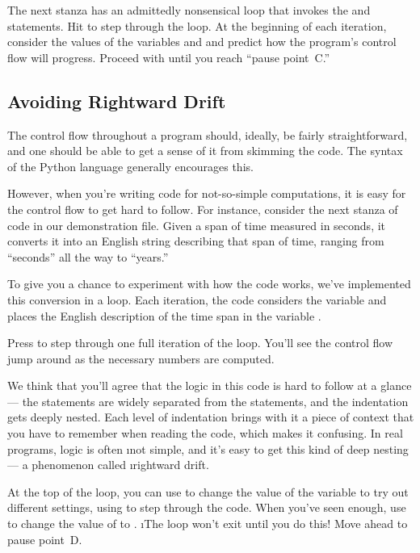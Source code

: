 \documentclass[letterpaper, 12pt, titlepage, twoside]{article}
\begin{document}
The next stanza has an admittedly nonsensical  loop that invokes the
 and  statements. \typeit Hit  to step through the
loop. At the beginning of each iteration, consider the values of the variables
 and  and predict how the program's control flow will progress.
\typeit Proceed with  until you reach ``pause point~C.''

\subsection*{Avoiding Rightward Drift}

The control flow throughout a program should, ideally, be fairly
straightforward, and one should be able to get a sense of it from skimming the
code. The syntax of the Python language generally encourages this.

However, when you're writing code for not-so-simple computations, it is easy
for the control flow to get hard to follow. For instance, consider the next
stanza of code in our demonstration file. Given a span of time measured in
seconds, it converts it into an English string describing that span of time,
ranging from ``seconds'' all the way to ``years.''

To give you a chance to experiment with how the code works, we've implemented
this conversion in a loop. Each iteration, the code considers the variable
 and places the English description of the time span in the
variable .

\typeit Press  to step through one full iteration of the loop. You'll see
the control flow jump around as the necessary numbers are computed.

We think that you'll agree that the logic in this code is hard to follow at a
glance --- the  statements are widely separated from the 
statements, and the indentation gets deeply nested. Each level of indentation
brings with it a piece of context that you have to remember when reading the
code, which makes it confusing. In real programs, logic is often \i{not}
simple, and it's easy to get this kind of deep nesting --- a phenomenon called
\i{rightward drift}.

\typeit At the top of the loop, you can use  to change the value
of the  variable to try out different settings, using  to step
through the code. When you've seen enough, use  to change the
value of  to . \i{The loop won't exit until you do
  this!} Move ahead to pause point~D.
\end{document}
